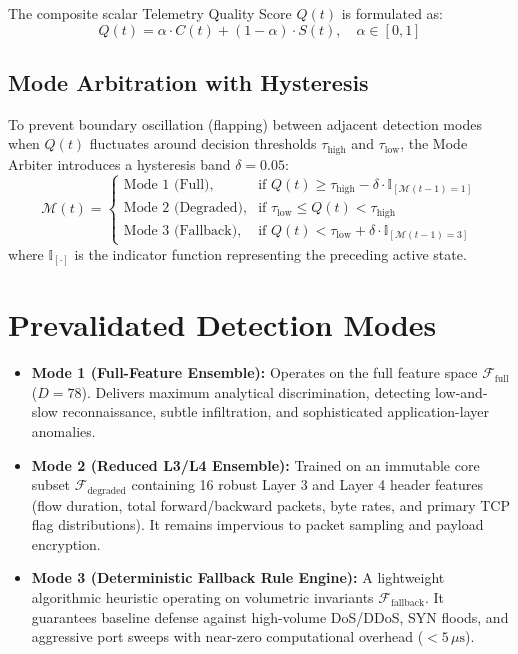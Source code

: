 \documentclass[conference]{IEEEtran}
\begin{document}
The composite scalar Telemetry Quality Score $Q(t)$ is formulated as:
\begin{equation}
    Q(t) = \alpha \cdot C(t) + (1 - \alpha) \cdot S(t), \quad \alpha \in [0, 1]
\end{equation}

\subsection{Mode Arbitration with Hysteresis}
To prevent boundary oscillation (flapping) between adjacent detection modes when $Q(t)$ fluctuates around decision thresholds $\tau_{\text{high}}$ and $\tau_{\text{low}}$, the Mode Arbiter introduces a hysteresis band $\delta = 0.05$:
\begin{equation}
\mathcal{M}(t) = 
\begin{cases}
\text{Mode 1 (Full)}, & \text{if } Q(t) \ge \tau_{\text{high}} - \delta \cdot \mathbb{I}_{[\mathcal{M}(t-1)=1]} \\
\text{Mode 2 (Degraded)}, & \text{if } \tau_{\text{low}} \le Q(t) < \tau_{\text{high}} \\
\text{Mode 3 (Fallback)}, & \text{if } Q(t) < \tau_{\text{low}} + \delta \cdot \mathbb{I}_{[\mathcal{M}(t-1)=3]}
\end{cases}
\end{equation}
where $\mathbb{I}_{[\cdot]}$ is the indicator function representing the preceding active state.

\section{Prevalidated Detection Modes}
\begin{itemize}
    \item \textbf{Mode 1 (Full-Feature Ensemble):} Operates on the full feature space $\mathcal{F}_{\text{full}}$ ($D=78$). Delivers maximum analytical discrimination, detecting low-and-slow reconnaissance, subtle infiltration, and sophisticated application-layer anomalies.
    \item \textbf{Mode 2 (Reduced L3/L4 Ensemble):} Trained on an immutable core subset $\mathcal{F}_{\text{degraded}}$ containing 16 robust Layer 3 and Layer 4 header features (flow duration, total forward/backward packets, byte rates, and primary TCP flag distributions). It remains impervious to packet sampling and payload encryption.
    \item \textbf{Mode 3 (Deterministic Fallback Rule Engine):} A lightweight algorithmic heuristic operating on volumetric invariants $\mathcal{F}_{\text{fallback}}$. It guarantees baseline defense against high-volume DoS/DDoS, SYN floods, and aggressive port sweeps with near-zero computational overhead ($<5\,\mu\text{s}$).
\end{itemize}
\end{document}

